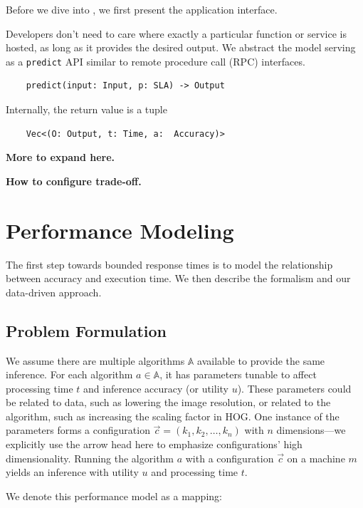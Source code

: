 Before we dive into \sysname{}, we first present the application interface.

Developers don't need to care where exactly a particular function or service is
hosted, as long as it provides the desired output. We abstract the model serving
as a \texttt{predict} API similar to remote procedure call (RPC) interfaces.

\begin{lstlisting}
    predict(input: Input, p: SLA) -> Output
\end{lstlisting}

Internally, the return value is a tuple

\begin{lstlisting}
    Vec<(O: Output, t: Time, a:  Accuracy)>
\end{lstlisting}

\textbf{More to expand here.}

\textbf{How to configure trade-off.}

\section{Performance Modeling}
\label{sec:performance-modeling}

The first step towards bounded response times is to model the relationship
between accuracy and execution time. We then describe the formalism and our
data-driven approach.

\subsection{Problem Formulation}
\label{sec:problem-formulation}

We assume there are multiple algorithms $\mathbb{A}$ available to provide the
same inference. For each algorithm $a \in \mathbb{A}$, it has parameters tunable
to affect processing time $t$ and inference accuracy (or utility $u$). These
parameters could be related to data, such as lowering the image resolution, or
related to the algorithm, such as increasing the scaling factor in HOG. One
instance of the parameters forms a configuration
$\vec{c} = (k_1, k_2, \dots, k_n)$ with $n$ dimensions---we explicitly use the
arrow head here to emphasize configurations' high dimensionality. Running the
algorithm $a$ with a configuration $\vec{c}$ on a machine $m$ yields an
inference with utility $u$ and processing time $t$.

We denote this performance model as a mapping:

